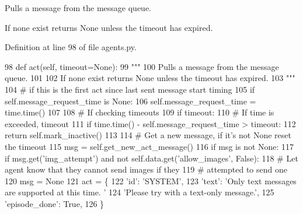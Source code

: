 \begin{DoxyVerb}Pulls a message from the message queue.

If none exist returns None unless the timeout has expired.
\end{DoxyVerb}
 

Definition at line 98 of file agents.\+py.


\begin{DoxyCode}
98     \textcolor{keyword}{def }act(self, timeout=None):
99         \textcolor{stringliteral}{"""}
100 \textcolor{stringliteral}{        Pulls a message from the message queue.}
101 \textcolor{stringliteral}{}
102 \textcolor{stringliteral}{        If none exist returns None unless the timeout has expired.}
103 \textcolor{stringliteral}{        """}
104         \textcolor{comment}{# if this is the first act since last sent message start timing}
105         \textcolor{keywordflow}{if} self.message\_request\_time \textcolor{keywordflow}{is} \textcolor{keywordtype}{None}:
106             self.message\_request\_time = time.time()
107 
108         \textcolor{comment}{# If checking timeouts}
109         \textcolor{keywordflow}{if} timeout:
110             \textcolor{comment}{# If time is exceeded, timeout}
111             \textcolor{keywordflow}{if} time.time() - self.message\_request\_time > timeout:
112                 \textcolor{keywordflow}{return} self.mark\_inactive()
113 
114         \textcolor{comment}{# Get a new message, if it's not None reset the timeout}
115         msg = self.get\_new\_act\_message()
116         \textcolor{keywordflow}{if} msg \textcolor{keywordflow}{is} \textcolor{keywordflow}{not} \textcolor{keywordtype}{None}:
117             \textcolor{keywordflow}{if} msg.get(\textcolor{stringliteral}{'img\_attempt'}) \textcolor{keywordflow}{and} \textcolor{keywordflow}{not} self.data.get(\textcolor{stringliteral}{'allow\_images'}, \textcolor{keyword}{False}):
118                 \textcolor{comment}{# Let agent know that they cannot send images if they}
119                 \textcolor{comment}{# attempted to send one}
120                 msg = \textcolor{keywordtype}{None}
121                 act = \{
122                     \textcolor{stringliteral}{'id'}: \textcolor{stringliteral}{'SYSTEM'},
123                     \textcolor{stringliteral}{'text'}: \textcolor{stringliteral}{'Only text messages are supported at this time. '}
124                     \textcolor{stringliteral}{'Please try with a text-only message.'},
125                     \textcolor{stringliteral}{'episode\_done'}: \textcolor{keyword}{True},
126                 \}

\end{DoxyCode}
